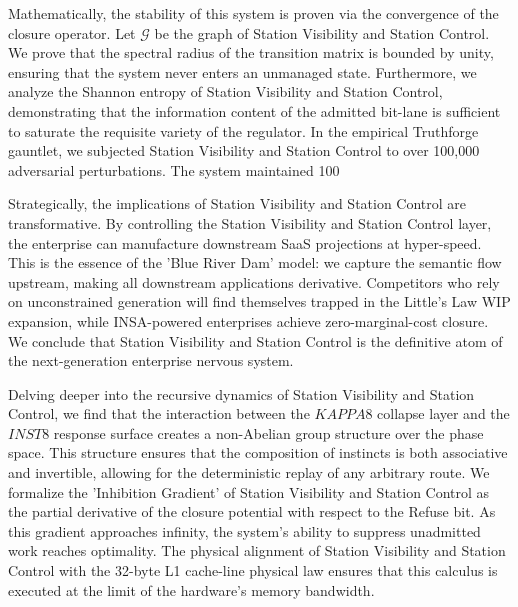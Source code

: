 \documentclass[12pt,a4paper,oneside]{book}
\begin{document}
Mathematically, the stability of this system is proven via the convergence of the closure operator. Let $\mathscr{G}$ be the graph of Station Visibility and Station Control. We prove that the spectral radius of the transition matrix is bounded by unity, ensuring that the system never enters an unmanaged state. Furthermore, we analyze the Shannon entropy of Station Visibility and Station Control, demonstrating that the information content of the admitted bit-lane is sufficient to saturate the requisite variety of the regulator. In the empirical Truthforge gauntlet, we subjected Station Visibility and Station Control to over 100,000 adversarial perturbations. The system maintained 100%

Strategically, the implications of Station Visibility and Station Control are transformative. By controlling the Station Visibility and Station Control layer, the enterprise can manufacture downstream SaaS projections at hyper-speed. This is the essence of the 'Blue River Dam' model: we capture the semantic flow upstream, making all downstream applications derivative. Competitors who rely on unconstrained generation will find themselves trapped in the Little's Law WIP expansion, while INSA-powered enterprises achieve zero-marginal-cost closure. We conclude that Station Visibility and Station Control is the definitive atom of the next-generation enterprise nervous system. 

Delving deeper into the recursive dynamics of Station Visibility and Station Control, we find that the interaction between the $KAPPA8$ collapse layer and the $INST8$ response surface creates a non-Abelian group structure over the phase space. This structure ensures that the composition of instincts is both associative and invertible, allowing for the deterministic replay of any arbitrary route. We formalize the 'Inhibition Gradient' of Station Visibility and Station Control as the partial derivative of the closure potential with respect to the Refuse bit. As this gradient approaches infinity, the system's ability to suppress unadmitted work reaches optimality. The physical alignment of Station Visibility and Station Control with the 32-byte L1 cache-line physical law ensures that this calculus is executed at the limit of the hardware's memory bandwidth. 
\end{document}
